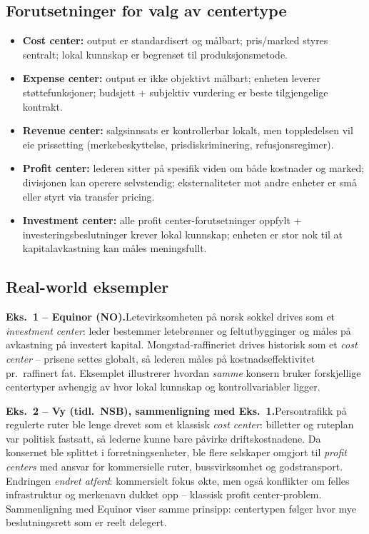 \subsection*{Forutsetninger for valg av centertype}
\begin{itemize}\setlength{\itemsep}{2pt}
\item \textbf{Cost center:} output er standardisert og målbart; pris/marked styres sentralt; lokal kunnskap er begrenset til produksjonsmetode.
\item \textbf{Expense center:} output er ikke objektivt målbart; enheten leverer støttefunksjoner; budsjett + subjektiv vurdering er beste tilgjengelige kontrakt.
\item \textbf{Revenue center:} salgsinnsats er kontrollerbar lokalt, men toppledelsen vil eie prissetting (merkebeskyttelse, prisdiskriminering, refusjonsregimer).
\item \textbf{Profit center:} lederen sitter på spesifik viden om både kostnader og marked; divisjonen kan operere selvstendig; eksternaliteter mot andre enheter er små eller styrt via transfer pricing.
\item \textbf{Investment center:} alle profit center-forutsetninger oppfylt + investeringsbeslutninger krever lokal kunnskap; enheten er stor nok til at kapitalavkastning kan måles meningsfullt.
\end{itemize}

\subsection*{Real-world eksempler}

\textbf{Eks.~1 -- Equinor (NO).}\quad [EKS]
Letevirksomheten på norsk sokkel drives som et \emph{investment center}: leder bestemmer letebrønner og feltutbygginger og måles på avkastning på investert kapital. Mongstad-raffineriet drives historisk som et \emph{cost center} -- prisene settes globalt, så lederen måles på kostnadseffektivitet pr.\ raffinert fat. Eksemplet illustrerer hvordan \emph{samme} konsern bruker forskjellige centertyper avhengig av hvor lokal kunnskap og kontrollvariabler ligger.

\textbf{Eks.~2 -- Vy (tidl.\ NSB), sammenligning med Eks.~1.}\quad [EKS]
Persontrafikk på regulerte ruter ble lenge drevet som et klassisk \emph{cost center}: billetter og ruteplan var politisk fastsatt, så lederne kunne bare påvirke driftskostnadene. Da konsernet ble splittet i forretningsenheter, ble flere selskaper omgjort til \emph{profit centers} med ansvar for kommersielle ruter, bussvirksomhet og godstransport. Endringen \emph{endret atferd}: kommersielt fokus økte, men også konflikter om felles infrastruktur og merkenavn dukket opp -- klassisk profit center-problem. Sammenligning med Equinor viser samme prinsipp: centertypen følger hvor mye beslutningsrett som er reelt delegert.

